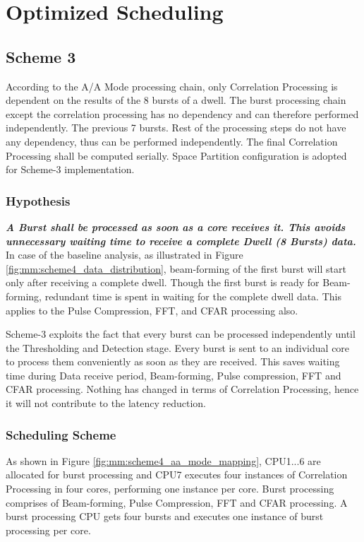 \chapter{Optimized Scheduling}
\label{chap:mode_mapping}

\section{Scheme 3}
\label{sec:mm:scheme4}
According to the A/A Mode processing chain, only Correlation Processing is dependent on the results of the 8 bursts of a dwell. The burst processing chain except the correlation processing has no dependency and can therefore performed independently. The previous 7 bursts. Rest of the processing steps do not have any dependency, thus can be performed independently. The final Correlation Processing shall be computed serially. Space Partition configuration is adopted for Scheme-3 implementation.

\subsection{Hypothesis}
\textbf{\textsl{A Burst shall be processed as soon as a core receives it. This avoids unnecessary waiting time to receive a complete Dwell (8 Bursts) data.}}\\[0.2cm]
In case of the baseline analysis, as illustrated in Figure \ref{fig:mm:scheme4_data_distribution}, beam-forming of the first burst will start only after receiving a complete dwell. Though the first burst is ready for Beam-forming, redundant time is spent in waiting for the complete dwell data. This applies to the Pulse Compression, FFT, and CFAR processing also.

Scheme-3 exploits the fact that every burst can be processed independently until the Thresholding and Detection stage. Every burst is sent to an individual core to process them conveniently as soon as they are received. This saves waiting time during Data receive period, Beam-forming, Pulse compression, FFT and CFAR processing. Nothing has changed in terms of Correlation Processing, hence it will not contribute to the latency reduction.

\subsection{Scheduling Scheme}
As shown in Figure \ref{fig:mm:scheme4_aa_mode_mapping}, CPU1...6 are allocated for burst processing and CPU7 executes four instances of Correlation Processing in four cores, performing one instance per core. Burst processing comprises of Beam-forming, Pulse Compression, FFT and CFAR processing. A burst processing CPU gets four bursts and executes one instance of burst processing per core.

